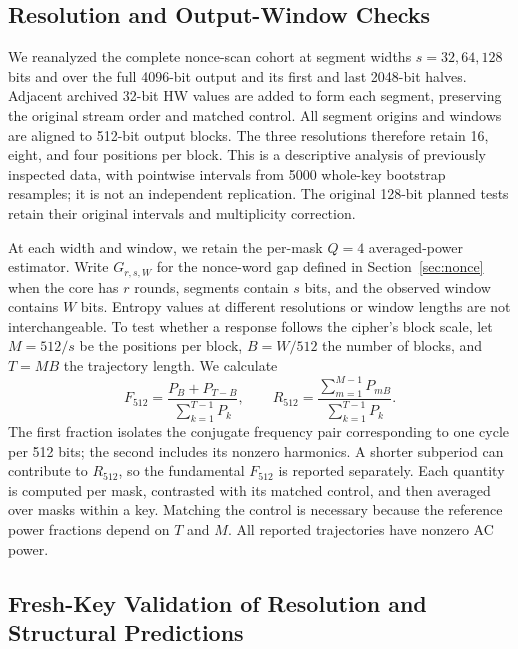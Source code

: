 \subsection{Resolution and Output-Window Checks}\label{sec:resolutionmethods}

We reanalyzed the complete nonce-scan cohort at segment widths $s=32,64,128$ bits and over the full 4096-bit output and its first and last 2048-bit halves. Adjacent archived 32-bit HW values are added to form each segment, preserving the original stream order and matched control. All segment origins and windows are aligned to 512-bit output blocks. The three resolutions therefore retain 16, eight, and four positions per block. This is a descriptive analysis of previously inspected data, with pointwise intervals from 5000 whole-key bootstrap resamples; it is not an independent replication. The original 128-bit planned tests retain their original intervals and multiplicity correction.

At each width and window, we retain the per-mask $Q=4$ averaged-power estimator. Write $G_{r,s,W}$ for the nonce-word gap defined in Section~\ref{sec:nonce} when the core has $r$ rounds, segments contain $s$ bits, and the observed window contains $W$ bits. Entropy values at different resolutions or window lengths are not interchangeable. To test whether a response follows the cipher's block scale, let $M=512/s$ be the positions per block, $B=W/512$ the number of blocks, and $T=MB$ the trajectory length. We calculate
\begin{equation}
 F_{512}=\frac{P_B+P_{T-B}}{\sum_{k=1}^{T-1}P_k},\qquad
 R_{512}=\frac{\sum_{m=1}^{M-1}P_{mB}}{\sum_{k=1}^{T-1}P_k}.
 \label{eq:blockpower}
\end{equation}
The first fraction isolates the conjugate frequency pair corresponding to one cycle per 512 bits; the second includes its nonzero harmonics. A shorter subperiod can contribute to $R_{512}$, so the fundamental $F_{512}$ is reported separately. Each quantity is computed per mask, contrasted with its matched control, and then averaged over masks within a key. Matching the control is necessary because the reference power fractions depend on $T$ and $M$. All reported trajectories have nonzero AC power.

\subsection{Fresh-Key Validation of Resolution and Structural Predictions}\label{sec:resolutionvalidation}

